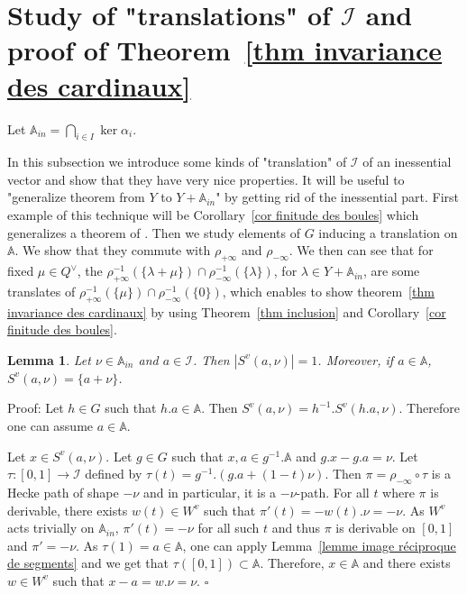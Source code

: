 \documentclass[12pt]{article}
\theoremstyle{plain}
\newtheorem{lemme}[thm]{Lemma}
\theoremstyle{definition}
\newcommand{\A}{\mathbb{A}}
\newcommand{\I}{\mathcal{I}}
\begin{document}
\section{Study of "translations" of $\I$ and proof of Theorem~\ref{thm invariance des cardinaux}}\label{sect translations}

Let $\A_{in}=\bigcap_{i\in I} \ker \alpha_i$.

In this subsection we introduce some kinds of "translation" of $\I$ of an inessential vector and show that they have very nice properties. It will be useful to "generalize theorem from $Y$ to $Y+\A_{in}$" by getting rid of the inessential part. First example of this technique will be Corollary~\ref{cor finitude des boules} which generalizes a theorem of \cite{gaussent2014spherical}. Then we study elements of $G$ inducing a translation on $\A$. We show that they commute with $\rho_{+\infty}$ and $\rho_{-\infty}$. We then can see that for fixed $\mu\in Q^\vee$, the $\rho_{+\infty}^{-1}(\{\lambda+\mu\})\cap\rho_{-\infty}^{-1}(\{\lambda\})$, for $\lambda\in Y+\A_{in}$, are some translates of  $\rho_{+\infty}^{-1}(\{\mu\})\cap\rho_{-\infty}^{-1}(\{0\})$, which enables to show theorem~\ref{thm invariance des cardinaux} by using Theorem~\ref{thm inclusion} and Corollary~\ref{cor finitude des boules}.

\begin{lemme}\label{lemme partie inessentielle}
 Let $\nu\in\A_{in}$ and $a\in \I$. Then $|S^v(a,\nu)|=1$. Moreover, if $a\in \A$, $S^v(a,\nu)=\{a+\nu\}$. 

\end{lemme} 

Proof: Let $h\in G$ such that $h.a\in \A$. Then $S^v(a,\nu)=h^{-1}.S^v(h.a,\nu)$. Therefore one can assume $a\in \A$. 

Let $x\in S^v(a,\nu)$. Let $g\in G$ such that $x,a\in g^{-1}.\A$ and $g.x-g.a=\nu$. Let $\tau:[0,1]\rightarrow \I$ defined by $\tau(t)=g^{-1}.(g.a+(1-t)\nu)$. Then $\pi=\rho_{-\infty}\circ \tau$ is a Hecke path of shape $-\nu$ and in particular,  it is a $-\nu$-path. For all $t$ where $\pi$ is derivable, there exists $w(t)\in W^v$ such that $\pi'(t)=-w(t).\nu=-\nu$. As $W^v$ acts trivially on $\A_{in}$, $\pi'(t)=-\nu$ for all such $t$ and thus $\pi$ is derivable on $[0,1]$ and $\pi'=-\nu$. As $\tau(1)=a\in \A$, one can apply Lemma~\ref{lemme image réciproque de segments} and we get that $\tau([0,1])\subset \A$. Therefore, $x\in \A$ and there exists $w\in W^v$ such that $x-a=w.\nu=\nu$. $\square$

\vspace{3mm}
\end{document}
